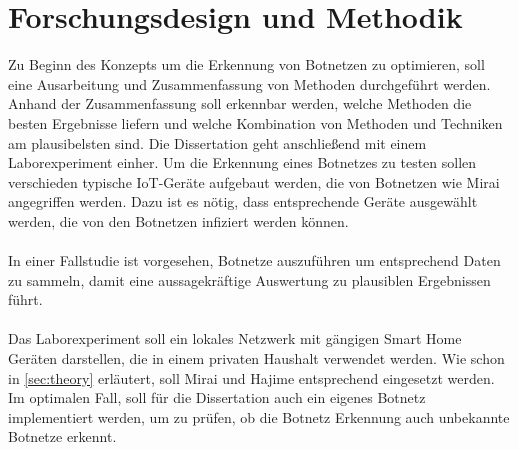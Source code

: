 \section{Forschungsdesign und Methodik}
\label{sec:methods}

Zu Beginn des Konzepts um die Erkennung von Botnetzen zu optimieren, soll eine Ausarbeitung und Zusammenfassung von Methoden 
durchgeführt werden. Anhand der Zusammenfassung soll erkennbar werden, welche Methoden die besten Ergebnisse liefern 
und welche Kombination von Methoden und Techniken am plausibelsten sind. Die Dissertation geht anschließend mit einem 
Laborexperiment einher. Um die Erkennung eines Botnetzes zu testen sollen verschieden typische IoT-Geräte aufgebaut werden, 
die von Botnetzen wie Mirai angegriffen werden. Dazu ist es nötig, dass entsprechende Geräte ausgewählt werden, die von den 
Botnetzen infiziert werden können. \\ \\ In einer Fallstudie ist vorgesehen, Botnetze auszuführen um entsprechend Daten
zu sammeln, damit eine aussagekräftige Auswertung zu plausiblen Ergebnissen führt. \\ \\ Das Laborexperiment soll ein lokales 
Netzwerk mit gängigen Smart Home Geräten darstellen, die in einem privaten Haushalt verwendet werden. Wie schon in \ref{sec:theory}
erläutert, soll Mirai und Hajime entsprechend eingesetzt werden. Im optimalen Fall, soll für die Dissertation auch ein eigenes Botnetz
implementiert werden, um zu prüfen, ob die Botnetz Erkennung auch unbekannte Botnetze erkennt.

